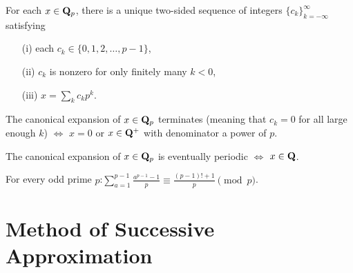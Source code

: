 \begin{prob}\label{prob:qpdigits}\label{prob:84} For each $x \in \mathbf{Q}_p$, there is a unique two-sided sequence of integers $\{c_k\}_{k=-\infty}^{\infty}$ satisfying
\begin{enumerate}
    \item[(i)] each $c_k \in \{0,1,2,\dots,p-1\}$,
    \item[(ii)] $c_k$ is nonzero for only finitely many $k < 0$,
    \item[(iii)] $x = \sum_{k} c_k p^k$.
\end{enumerate}
\end{prob}


\begin{prob}\label{prob:85} The canonical expansion of $x \in \mathbf{Q}_p$ 
terminates (meaning that $c_k=0$ for all large enough $k$) $\Longleftrightarrow$ $x=0$ or $x\in\mathbf{Q}^{+}$ with denominator a power of $p$.
\end{prob}

\begin{prob}\label{prob:86} The canonical expansion of $x\in \mathbf{Q}_p$ is eventually periodic $\Longleftrightarrow$ $x\in\mathbf{Q}$.
\end{prob}

\vspace{-0.1in}
\curious

\begin{prob}\label{ex:wilson00}\label{prob:87}  For every odd prime $p$:\quad $\displaystyle\sum_{a=1}^{p-1} \frac{a^{p-1}-1}{p} \equiv \frac{(p-1)! + 1}{p} \pmod{p}$. 
\end{prob}


\section*{Method of Successive Approximation}


